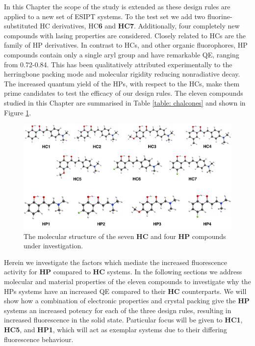 In this Chapter the scope of the study is extended as these design rules are applied to a new set of ESIPT systems. To the test set we add two fluorine-substituted \ac{HC} derivatives, \ac{HC}\textbf{6} and \textbf{HC7}.\cite{Cheng2016} Additionally, four completely new compounds with lasing properties are considered. Closely related to \acp{HC} are the family of \ac{HP} derivatives.\cite{Tang2016} In contrast to \acp{HC}, and other organic fluorophores, \ac{HP} compounds contain only a single aryl group and have remarkable \ac{QE}, ranging from 0.72-0.84. This has been qualitatively attributed experimentally to the herringbone packing mode and molecular rigidity reducing nonradiative decay. The increased quantum yield of the \acp{HP}, with respect to the \acp{HC}, make them prime candidates to test the efficacy of our  design rules. The eleven compounds studied in this Chapter are summarised in Table \ref{table: chalcones} and shown in Figure \ref{figure: HCHP_structures}.
\begin{figure}[t]
\centering
  \includegraphics[width=\linewidth]{5ConnectingCrystalStructure/HCHP_structures.pdf}
  \caption[Molecular structures of eleven \textbf{HC} and \textbf{HP} compounds]{The molecular structure of the seven \textbf{HC} and four \textbf{HP} compounds under investigation.}
  \label{figure: HCHP_structures}
\end{figure}
Herein we investigate the factors which mediate the increased fluorescence activity for \textbf{HP} compared to \textbf{HC} systems. In the following sections we address molecular and material properties of the eleven compounds to investigate why the \acp{HP} systems have an increased \ac{QE} compared to their \textbf{HC} counterparts. We will show how a combination of electronic properties and crystal packing give the \textbf{HP} systems an increased potency for each of the three design rules, resulting in increased fluorescence in the solid state. Particular focus will be given to \textbf{HC1}, \textbf{HC5}, and \textbf{HP1}, which will act as exemplar systems due to their differing fluorescence behaviour.


